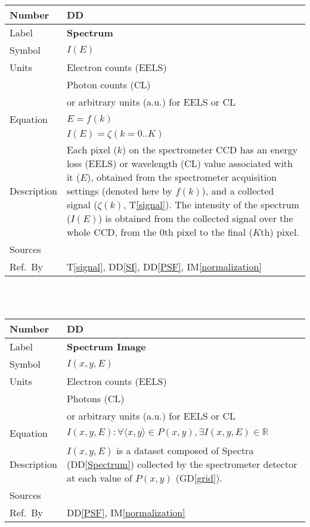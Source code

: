 \documentclass[12pt]{article}
\newcommand{\colAwidth}{0.13\textwidth}
\newcommand{\colBwidth}{0.82\textwidth}
\newcounter{defnum} %
\newcommand{\dref}[1]{GD\ref{#1}}
\newcounter{datadefnum} %
\newcommand{\ddref}[1]{DD\ref{#1}}
\newcommand{\tref}[1]{T\ref{#1}}
\newcommand{\iref}[1]{IM\ref{#1}}
\begin{document}
\noindent
\begin{minipage}{\textwidth}
	\renewcommand*{\arraystretch}{1.5}
	\begin{tabular}{| p{\colAwidth} | p{\colBwidth}|}
		\hline
		\rowcolor[gray]{0.9}
		Number& DD{datadefnum}\thedatadefnum \label{Spectrum}\\
		\hline
		Label& \bf Spectrum\\
		\hline
		Symbol & $I(E)$\\
		\hline
		Units & Electron counts (EELS)\\
		& Photon counts (CL)\\
		& or arbitrary units (a.u.) for EELS or CL\\
		  \hline
		  Equation & $E = f(k)$\\
		  & $I(E) = \zeta(k=0..K)$\\
		  \hline
		  Description & Each pixel ($k$) on the spectrometer CCD has an energy loss (EELS) or wavelength (CL) value associated with it ($E$), obtained from the spectrometer acquisition settings (denoted here by $f(k)$), and a collected signal ($\zeta(k)$, \tref{signal}). The intensity of the spectrum ($I(E)$) is obtained from the collected signal over the whole CCD, from the 0th pixel to the final ($K$th) pixel.\\
		  \hline
		  Sources & \cite{egerton_introduction_2011} \\
		  \hline
		  Ref.\ By & \tref{signal}, \ddref{SI}, \ddref{PSF}, \iref{normalization}\\
		  \hline
	\end{tabular}
\end{minipage}\\

~\newline

\noindent
\begin{minipage}{\textwidth}
\renewcommand*{\arraystretch}{1.5}
\begin{tabular}{| p{\colAwidth} | p{\colBwidth}|}
	\hline
	\rowcolor[gray]{0.9}
	Number& DD{datadefnum}\thedatadefnum \label{SI}\\
	\hline
	Label& \bf Spectrum Image\\
	\hline
	Symbol &$I(x, y, E)$\\
	\hline
	Units & Electron counts (EELS)\\
	& Photons (CL)\\
	& or arbitrary units (a.u.) for EELS or CL\\
	\hline
	Equation& $I(x, y, E): \forall \langle x, y \rangle \in P(x,y), \exists I(x,y,E) \in \mathbb{R}$\\
	\hline
	Description & $I(x, y, E)$ is a dataset composed of Spectra (\ddref{Spectrum}) collected by the spectrometer detector at each value of $P(x,y)$ (\dref{grid}).
	\\
	\hline
	Sources&~\cite{jeanguillaume_spectrum-image:_1989}  \\
	\hline
	Ref.\ By & \ddref{PSF}, \iref{normalization}\\
	\hline
\end{tabular}
\end{minipage}\\
\end{document}
